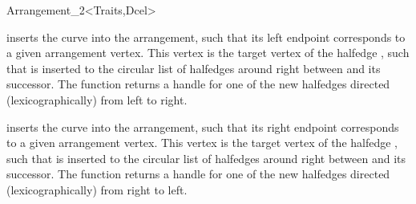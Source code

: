 \begin{ccRefClass}{Arrangement_2<Traits,Dcel>}
\begin{ccAdvanced}

  {inserts the curve  into the arrangement, such that its left
   endpoint corresponds to a given arrangement vertex. This vertex is the
   target vertex of the halfedge , such that  is inserted
   to the circular list of halfedges around  right
   between  and its successor. The function returns a handle for
   one of the new halfedges directed (lexicographically) from left to right.
   }

  {inserts the curve  into the arrangement, such that its right
   endpoint corresponds to a given arrangement vertex. This vertex is the
   target vertex of the halfedge , such that  is inserted
   to the circular list of halfedges around  right
   between  and its successor. The function returns a handle for
   one of the new halfedges directed (lexicographically) from right to left.
   }


\end{ccAdvanced}
\end{ccRefClass}
